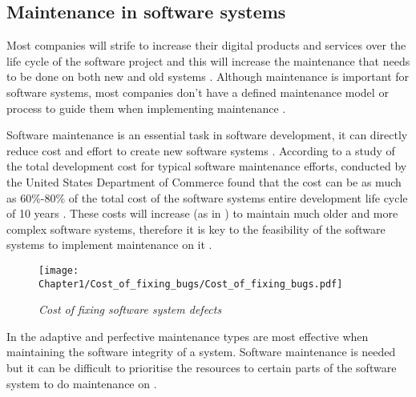 \subsection{Maintenance in software systems}
Most companies will strife to increase their digital products and services over the life cycle of the software project and this will increase the maintenance that needs to be done on both new and old systems \cite{Niu2018, Galster2019, Hasan2012}. Although maintenance is important for software systems, most companies don't have a defined maintenance model or process to guide them when implementing maintenance \cite{Stojanov2017}. \par Software maintenance is an essential task in software development, it can directly reduce cost and effort to create new software systems \cite{FrancisThamburaj2017}. According to a study of the total development cost for typical software maintenance efforts, conducted by the United States Department of Commerce found that the cost can be as much as $60\%$-$80\%$ of the total cost of the software systems entire development life cycle of 10 years \cite{Ogheneovo2014, Stark1996, Ackermann2009,Tang2010}. These costs will increase (as in ) to maintain much older and more complex software systems, therefore it is key to the feasibility of the software systems to implement maintenance on it \cite{Alenezi2016, Booch1986}.

\begin{figure}[!htb] %
	\centering %
	\texttt{[image: Chapter1/Cost\_of\_fixing\_bugs/Cost\_of\_fixing\_bugs.pdf]}
	\caption[Cost of fixing software system defects]
	{\textit{Cost of fixing software system defects \cite{Ogheneovo2014}}}\label{fig:CH1_Costs_of_fixing_bugs}
\end{figure} 

In  the adaptive and perfective maintenance types are most effective when maintaining the software integrity of a system. Software maintenance is needed but it can be difficult to prioritise the resources to certain parts of the software system to do maintenance on \cite{Mamone1994, Hasan2012}.

